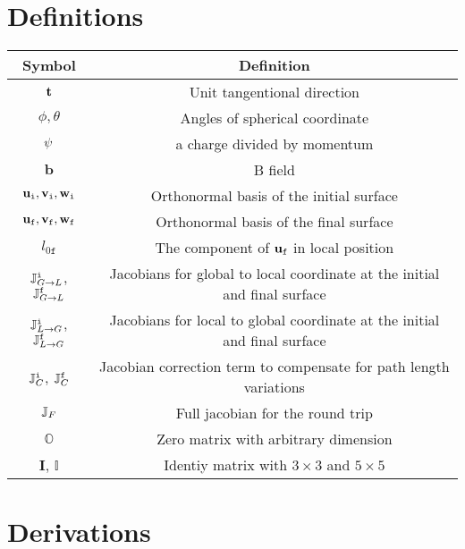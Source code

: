 \documentclass[12pt,a4paper]{scrarticle}
\begin{document}
\newcommand{\bfield}{\mathbf{b}}
\newcommand{\zeroMatrix}{\mathbb{O}}
\newcommand{\IdentityMatrixFive}{\mathbb{I}}
\newcommand{\IdentityMatrixThree}{\mathbf{I}}

\section{Definitions}

\begin{center}
\begin{tabular}{||c c ||} 
 \hline
 Symbol & Definition  \\ [0.5ex] 
 \hline\hline
 $\mathbf{t}$ & Unit tangentional direction \\
 \hline
 $\phi, \theta$ & Angles of spherical coordinate \\
 \hline
 $\psi$ & a charge divided by momentum \\
 \hline
 $\bfield$ & B field \\
 \hline 
 $\mathbf{u}_\texttt{i}, \mathbf{v}_\texttt{i}, \mathbf{w}_\texttt{i}$ & Orthonormal basis of the initial surface  \\ 
 \hline
 $\mathbf{u}_\texttt{f}, \mathbf{v}_\texttt{f}, \mathbf{w}_\texttt{f}$ & Orthonormal basis of the final surface  \\ 
 \hline
 $l_{0\texttt{f}}$ & The component of $\mathbf{u}_\texttt{f}$ in local position \\
 \hline 
 $\mathbb{J}_{G \rightarrow L}^{\texttt{i}}$, $\mathbb{J}_{G \rightarrow L}^{\texttt{f}}$ & Jacobians for global to local coordinate at the initial and final surface  \\
 \hline
  $\mathbb{J}_{L \rightarrow G}^{\texttt{i}}$, $\mathbb{J}_{L \rightarrow G}^{\texttt{f}}$ &  Jacobians for local to global coordinate at the initial and final surface \\
 \hline
  $\mathbb{J}_{C}^{\texttt{i}}$, $\mathbb{J}_{C}^{\texttt{f}}$ &  Jacobian correction term to compensate for path length variations  \\ 
 \hline
 $\mathbb{J}_{F}$ & Full jacobian for the round trip \\
 \hline
 $\zeroMatrix$ & Zero matrix with arbitrary dimension \\
 \hline
 $\IdentityMatrixThree$, $\IdentityMatrixFive$  &  Identiy matrix with $3\times3$ and $5\times5$\\
 \hline
\end{tabular}
\end{center}

\section{Derivations}
\end{document}

